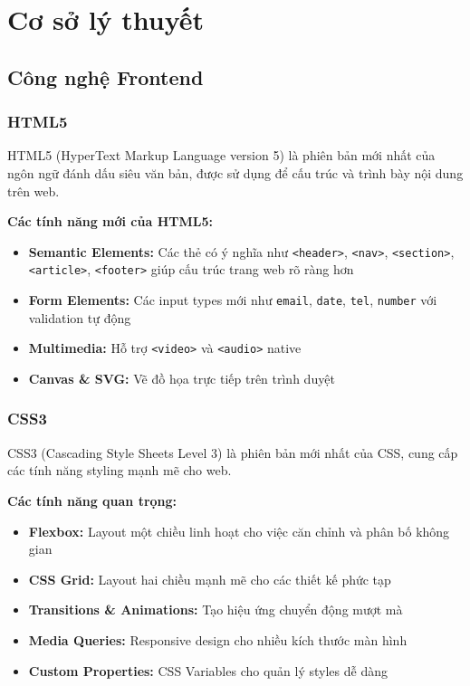 
\section{Cơ sở lý thuyết}

\subsection{Công nghệ Frontend}

\subsubsection{HTML5}

HTML5 (HyperText Markup Language version 5) là phiên bản mới nhất của ngôn ngữ đánh dấu siêu văn bản, được sử dụng để cấu trúc và trình bày nội dung trên web.

\textbf{Các tính năng mới của HTML5:}
\begin{itemize}
    \item \textbf{Semantic Elements:} Các thẻ có ý nghĩa như \texttt{<header>}, \texttt{<nav>}, \texttt{<section>}, \texttt{<article>}, \texttt{<footer>} giúp cấu trúc trang web rõ ràng hơn
    \item \textbf{Form Elements:} Các input types mới như \texttt{email}, \texttt{date}, \texttt{tel}, \texttt{number} với validation tự động
    \item \textbf{Multimedia:} Hỗ trợ \texttt{<video>} và \texttt{<audio>} native
    \item \textbf{Canvas \& SVG:} Vẽ đồ họa trực tiếp trên trình duyệt
\end{itemize}

\subsubsection{CSS3}

CSS3 (Cascading Style Sheets Level 3) là phiên bản mới nhất của CSS, cung cấp các tính năng styling mạnh mẽ cho web.

\textbf{Các tính năng quan trọng:}
\begin{itemize}
    \item \textbf{Flexbox:} Layout một chiều linh hoạt cho việc căn chỉnh và phân bố không gian
    \item \textbf{CSS Grid:} Layout hai chiều mạnh mẽ cho các thiết kế phức tạp
    \item \textbf{Transitions \& Animations:} Tạo hiệu ứng chuyển động mượt mà
    \item \textbf{Media Queries:} Responsive design cho nhiều kích thước màn hình
    \item \textbf{Custom Properties:} CSS Variables cho quản lý styles dễ dàng
\end{itemize}

